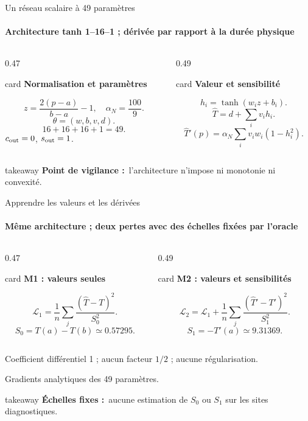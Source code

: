 \documentclass[aspectratio=169,11pt]{beamer}
\newcommand{\sectionlabel}{Question}
\newcommand{\card}[2]{%
  \begin{beamercolorbox}[wd=\linewidth,sep=7pt]{card}
  {\color{teal}\bfseries #1}\par\vspace{4pt}#2
  \end{beamercolorbox}}
\newcommand{\takeaway}[2]{%
  \begin{beamercolorbox}[wd=\linewidth,sep=7pt]{takeaway}
  \small\textbf{#1}\ #2
  \end{beamercolorbox}}
\begin{document}
\renewcommand{\sectionlabel}{03 / Réseau et supervision}
\begin{frame}[t]{Un réseau scalaire à 49 paramètres}
\framesubtitle{Architecture tanh 1--16--1 ; dérivée par rapport à la durée physique}
\begin{columns}[T,onlytextwidth]
\begin{column}{0.47\textwidth}
\card{Normalisation et paramètres}{%
\[z=\frac{2(p-a)}{b-a}-1,\quad\alpha_N=\frac{100}{9}.\]
\[\theta=(w,b,v,d).\]
\[16+16+16+1=49.\]
$c_{\rm out}=0$, $s_{\rm out}=1$.}
\end{column}
\begin{column}{0.49\textwidth}
\card{Valeur et sensibilité}{%
\[h_i=\tanh(w_i z+b_i).\]
\[\widehat T=d+\sum_i v_i h_i.\]
\[\widehat T'(p)=\alpha_N\sum_i v_iw_i(1-h_i^2).\]}
\end{column}
\end{columns}
\vfill
\takeaway{Point de vigilance :}{l'architecture n'impose ni monotonie ni convexité.}
\end{frame}

\begin{frame}[t]{Apprendre les valeurs et les dérivées}
\framesubtitle{Même architecture ; deux pertes avec des échelles fixées par l'oracle}
\begin{columns}[T,onlytextwidth]
\begin{column}{0.47\textwidth}
\card{M1 : valeurs seules}{%
\[\mathcal L_1=\frac1n\sum_j\frac{(\widehat T-T)^2}{S_0^2}.\]
\[S_0=T(a)-T(b)\simeq0.57295.\]}
\end{column}
\begin{column}{0.49\textwidth}
\card{M2 : valeurs et sensibilités}{%
\[\mathcal L_2=\mathcal L_1+\frac1n\sum_j\frac{(\widehat T'-T')^2}{S_1^2}.\]
\[S_1=-T'(a)\simeq9.31369.\]}
\end{column}
\end{columns}
\vspace{0.32cm}
Coefficient différentiel 1 ; aucun facteur $1/2$ ; aucune régularisation.\par\vspace{0.14cm}
Gradients analytiques des 49 paramètres.
\vfill
\takeaway{Échelles fixes :}{aucune estimation de $S_0$ ou $S_1$ sur les sites diagnostiques.}
\end{frame}
\end{document}
